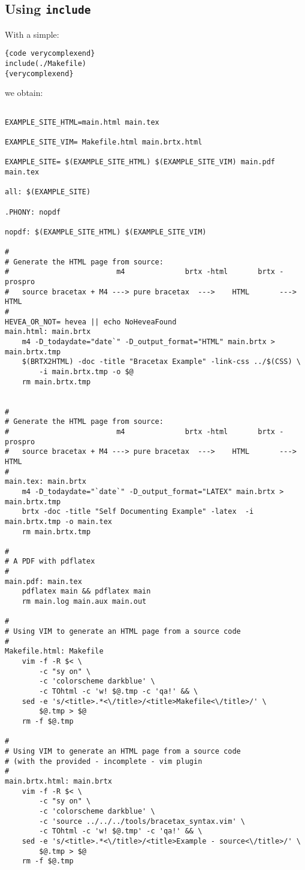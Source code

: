 \documentclass[a4paper,10pt]{article}
\begin{document}
\subsection{Using \texttt{include}}
\label{secinclude}
  With a simple: %
\begin{verbatim}
{code verycomplexend}
include(./Makefile)
{verycomplexend}
\end{verbatim}
 we obtain: %
\begin{verbatim}

EXAMPLE_SITE_HTML=main.html main.tex

EXAMPLE_SITE_VIM= Makefile.html main.brtx.html

EXAMPLE_SITE= $(EXAMPLE_SITE_HTML) $(EXAMPLE_SITE_VIM) main.pdf main.tex

all: $(EXAMPLE_SITE)

.PHONY: nopdf

nopdf: $(EXAMPLE_SITE_HTML) $(EXAMPLE_SITE_VIM)

#
# Generate the HTML page from source:
#                         m4              brtx -html       brtx -prospro    
#   source bracetax + M4 ---> pure bracetax  --->    HTML       --->     HTML
#
HEVEA_OR_NOT= hevea || echo NoHeveaFound
main.html: main.brtx
	m4 -D_todaydate="date`" -D_output_format="HTML" main.brtx > main.brtx.tmp
	$(BRTX2HTML) -doc -title "Bracetax Example" -link-css ../$(CSS) \
	    -i main.brtx.tmp -o $@
	rm main.brtx.tmp


#
# Generate the HTML page from source:
#                         m4              brtx -html       brtx -prospro    
#   source bracetax + M4 ---> pure bracetax  --->    HTML       --->     HTML
#
main.tex: main.brtx
	m4 -D_todaydate="`date`" -D_output_format="LATEX" main.brtx > main.brtx.tmp
	brtx -doc -title "Self Documenting Example" -latex  -i main.brtx.tmp -o main.tex
	rm main.brtx.tmp 

#
# A PDF with pdflatex
#
main.pdf: main.tex
	pdflatex main && pdflatex main
	rm main.log main.aux main.out

#
# Using VIM to generate an HTML page from a source code
#
Makefile.html: Makefile
	vim -f -R $< \
		-c "sy on" \
		-c 'colorscheme darkblue' \
		-c TOhtml -c 'w! $@.tmp -c 'qa!' && \
	sed -e 's/<title>.*<\/title>/<title>Makefile<\/title>/' \
		$@.tmp > $@
	rm -f $@.tmp

#
# Using VIM to generate an HTML page from a source code
# (with the provided - incomplete - vim plugin
#
main.brtx.html: main.brtx
	vim -f -R $< \
		-c "sy on" \
		-c 'colorscheme darkblue' \
		-c 'source ../../../tools/bracetax_syntax.vim' \
		-c TOhtml -c 'w! $@.tmp' -c 'qa!' && \
	sed -e 's/<title>.*<\/title>/<title>Example - source<\/title>/' \
		$@.tmp > $@ 
	rm -f $@.tmp


\end{verbatim}   
\end{document}
